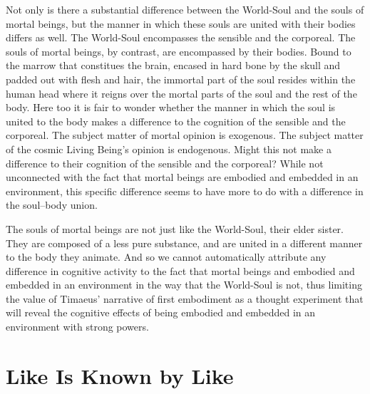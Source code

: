 \documentclass[12pt]{article}
\begin{document}
Not only is there a substantial difference between the World-Soul and the souls of mortal beings, but the manner in which these souls are united with their bodies differs as well. The World-Soul encompasses the sensible and the corporeal. The souls of mortal beings, by contrast, are encompassed by their bodies. Bound to the marrow that constitues the brain, encased in hard bone by the skull and padded out with flesh and hair, the immortal part of the soul resides within the human head where it reigns over the mortal parts of the soul and the rest of the body. Here too it is fair to wonder whether the manner in which the soul is united to the body makes a difference to the cognition of the sensible and the corporeal. The subject matter of mortal opinion is exogenous. The subject matter of the cosmic Living Being's opinion is endogenous. Might this not make a difference to their cognition of the sensible and the corporeal? While not unconnected with the fact that mortal beings are embodied and embedded in an environment, this specific difference seems to have more to do with a difference in the soul--body union.

The souls of mortal beings are not just like the World-Soul, their elder sister. They are composed of a less pure substance, and are united in a different manner to the body they animate. And so we cannot automatically attribute any difference in cognitive activity to the fact that mortal beings and embodied and embedded in an environment in the way that the World-Soul is not, thus limiting the value of Timaeus' narrative of first embodiment as a thought experiment that will reveal the cognitive effects of being embodied and embedded in an environment with strong powers.


\section{Like Is Known by Like} %
\label{sec:the_objects_of_the_world_soul_s_cognition}
\end{document}
